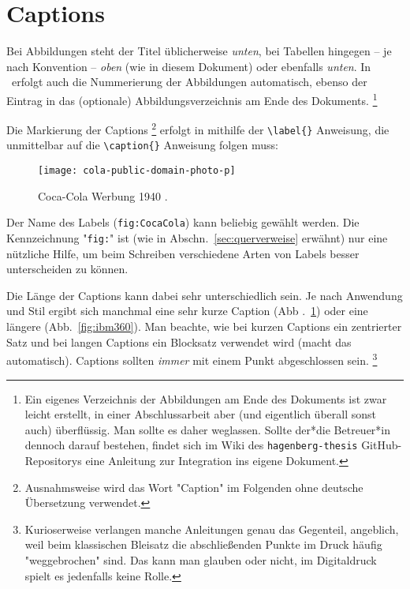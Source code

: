 \section{Captions}

Bei Abbildungen steht der Titel üblicherweise \emph{unten}, bei Tabellen
hingegen -- je nach Konvention -- \emph{oben} (wie in diesem Dokument) oder
ebenfalls \emph{unten}. In \latex\ erfolgt auch die Nummerierung der
Abbildungen automatisch, ebenso der Eintrag in das (optionale)
Abbildungsverzeichnis am Ende des Dokuments.%
\footnote{Ein eigenes Verzeichnis der Abbildungen am Ende des Dokuments ist
zwar leicht erstellt, in einer Abschlussarbeit aber (und eigentlich überall
sonst auch) überflüssig. Man sollte es daher weglassen. Sollte der*die
Betreuer*in dennoch darauf bestehen, findet sich im Wiki des
\texttt{hagenberg-thesis} GitHub-Repositorys eine Anleitung zur Integration ins
eigene Dokument.}

Die Markierung der Captions%
\footnote{Ausnahmsweise wird das Wort "Caption" im Folgenden ohne deutsche
	Übersetzung verwendet.}
erfolgt in \latex mithilfe der \verb!\label{}! Anweisung, die unmittelbar auf
die \verb!\caption{}! Anweisung folgen muss:
%
\begin{LaTeXCode}[numbers=none]
\begin{figure}
	\centering
	\texttt{[image: cola-public-domain-photo-p]}
	\caption{Coca-Cola Werbung 1940 \cite{CocaCola1940}.}
	\label{fig:CocaCola}
\end{figure}
\end{LaTeXCode}
%
Der Name des Labels (\texttt{fig:CocaCola}) kann beliebig gewählt werden. Die
Kennzeichnung "\texttt{fig:}" ist (wie in Abschn.\ \ref{sec:querverweise}
erwähnt) nur eine nützliche Hilfe, um beim Schreiben verschiedene Arten von
Labels besser unterscheiden zu können.

Die Länge der Captions kann dabei sehr unterschiedlich sein. Je nach
Anwendung und Stil ergibt sich manchmal eine sehr kurze Caption
(Abb .~\ref{fig:CocaCola}) oder eine längere (Abb.~\ref{fig:ibm360}).
Man beachte, wie bei kurzen Captions ein zentrierter Satz und bei langen
Captions ein Blocksatz verwendet wird (\latex macht das automatisch).
Captions sollten \emph{immer} mit einem Punkt abgeschlossen sein.%
\footnote{Kurioserweise verlangen manche Anleitungen genau das Gegenteil,
	angeblich, weil beim klassischen Bleisatz die abschließenden Punkte im
	Druck häufig "weggebrochen" sind. Das kann man glauben oder nicht, im
	Digitaldruck spielt es jedenfalls keine Rolle.}

